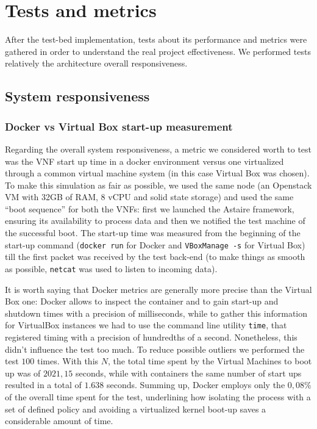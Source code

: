 \chapter{Tests and metrics}
\label{chap:test}
After the test-bed implementation, tests about its performance and metrics were
gathered in order to understand the real project effectiveness. We performed
tests relatively the architecture overall responsiveness.

\section{System responsiveness}

\subsection{Docker vs Virtual Box start-up measurement}

Regarding the overall system responsiveness, a metric we considered worth to
test was the VNF start up time in a docker environment versus one virtualized
through a common virtual machine system (in this case Virtual Box was chosen).
To make this simulation as fair as possible, we used the same node (an Openstack
VM with 32GB of RAM, 8 vCPU and solid state storage) and used the same ``boot
sequence'' for both the VNFs: first we launched the Astaire framework, ensuring
its availability to process data and then we notified the test machine of the
successful boot. The start-up time was measured from the beginning of the
start-up command (\verb!docker run! for Docker and \verb!VBoxManage -s! for
Virtual Box) till the first packet was received by the test back-end (to make
things as smooth as possible, \verb!netcat! was used to listen to incoming
data).

It is worth saying that Docker metrics are generally more precise than the
Virtual Box one: Docker allows to inspect the container and to gain start-up and
shutdown times with a precision of milliseconds, while to gather this 
information for VirtualBox instances we had to use the command line utility 
\verb!time!, that registered timing with a precision of hundredths of a second. 
Nonetheless, this didn't influence the test too much. To reduce possible 
outliers we performed the test $100$ times. With this $N$, the total time spent 
by the Virtual Machines to boot up was of $2021,15$ seconds, while with 
containers the same number of start ups resulted in a total of $1.638$ seconds. 
Summing up, Docker employs only the $0,08\%$ of the overall time spent for the 
test, underlining how isolating the process with a set of defined policy and 
avoiding a virtualized kernel boot-up saves a considerable amount of time.

